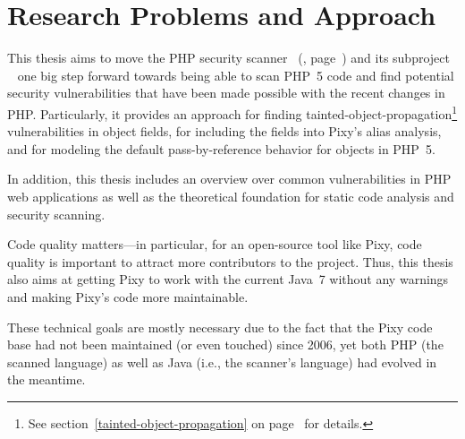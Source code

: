 \section{Research Problems and Approach}

This thesis aims to move the PHP security scanner ~(\cite{pixy}, page~\pageref{pixy}) and its subproject ~\cite{phpparser} one big step forward towards being able to scan PHP~5 code and find potential security vulnerabilities that have been made possible with the recent changes in PHP. Particularly, it provides an approach for finding tainted-object-propagation\footnote{See section~\ref{tainted-object-propagation} on page~\pageref{tainted-object-propagation} for details.} vulnerabilities in object fields, for including the fields into Pixy's alias analysis, and for modeling the default pass-by-reference behavior for objects in PHP~5.

In addition, this thesis includes an overview over common vulnerabilities in PHP web applications as well as the theoretical foundation for static code analysis and security scanning.

Code quality matters---in particular, for an open-source tool like Pixy, code quality is important to attract more contributors to the project. Thus, this thesis also aims at getting Pixy to work with the current Java~7 without any warnings and making Pixy's code more maintainable.

These technical goals are mostly necessary due to the fact that the Pixy code base had not been maintained (or even touched) since 2006, yet both PHP (\ie the scanned language) as well as Java (i.e., the scanner's language) had evolved in the meantime.
